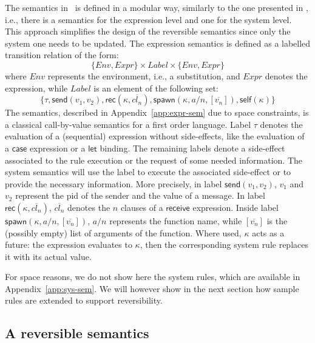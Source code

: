 \documentclass[runningheads]{llncs}
\newcommand{\ms}[1]{\mathsf{#1}}
\newcommand{\ol}[1]{\overline{#1}}
\begin{document}
The semantics in~\cite{LaneseNPV18} is defined in a modular way, similarly to the one presented in \cite{paper:distributed-erlang-sem}, i.e., there is a semantics for the expression level and one for the system level. This approach simplifies the design of the reversible semantics since only the system one needs to be updated. The expression semantics is defined as a labelled transition relation of the form:
\[ \{Env,Expr\} \times Label \times \{Env, Expr\} \]
where $Env$ represents the environment, i.e., a substitution, and $Expr$ denotes the expression, while $Label$ is an element of the following set: 
\[\{\tau, \ms{send}(v_1,v_2), \ms{rec}(\kappa, \overline{cl_n}),
  \ms{spawn}(\kappa, a/n, [\overline{v_n}]), \ms{self}(\kappa)\}\]
The semantics, described in Appendix~\ref{app:expr-sem} due to space constraints, is a classical call-by-value semantics for a first order language.
Label $\tau$ denotes the evaluation of a (sequential) expression without side-effects, like the evaluation of a $\ms{case}$ expression or a $\ms{let}$ binding.
The remaining labels denote a side-effect associated to the rule execution or the request of some needed information. The system semantics will use the label to execute the associated side-effect or to provide the necessary information. More precisely, in label $\ms{send}(v_1,v_2)$, $v_1$ and $v_2$ represent the pid of the sender and the value of a message. In label $\ms{rec}(\kappa, \overline{cl_n})$, $\ol{cl_n}$ denotes the $n$ clauses of a
$\ms{receive}$ expression. Inside label $\ms{spawn}(\kappa, a/n, [\overline{v_n}])$, $a/n$ represents the function
name, while $[\overline{v_n}]$ is the (possibly empty) list of arguments of the function. Where used, $\kappa$
acts as a future: the expression evaluates to $\kappa$, then the
corresponding system rule replaces it with its actual value.

For space reasons, we do not show here the system rules, which are available in Appendix~\ref{app:sys-sem}. We will however show in
the next section how sample rules are extended to support
reversibility.


\subsection{A reversible semantics}
\end{document}
